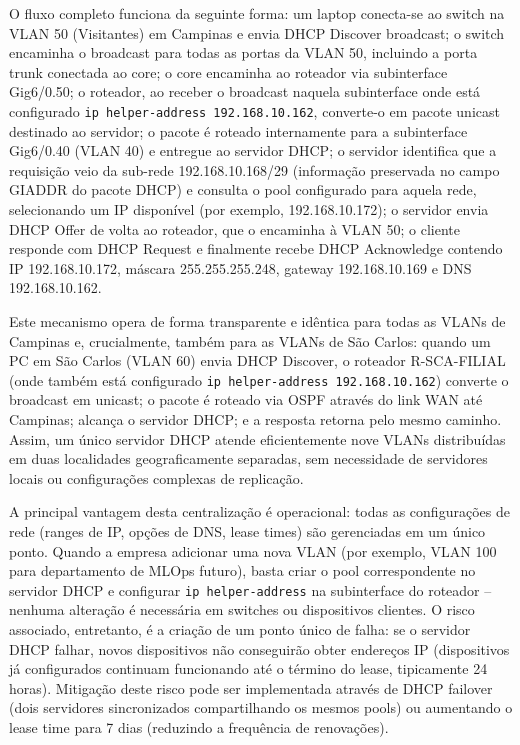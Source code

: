 \documentclass[12pt,a4paper]{article}
\begin{document}
O fluxo completo funciona da seguinte forma: um laptop conecta-se ao switch na VLAN 50 (Visitantes) em Campinas e envia DHCP Discover broadcast; o switch encaminha o broadcast para todas as portas da VLAN 50, incluindo a porta trunk conectada ao core; o core encaminha ao roteador via subinterface Gig6/0.50; o roteador, ao receber o broadcast naquela subinterface onde está configurado \texttt{ip helper-address 192.168.10.162}, converte-o em pacote unicast destinado ao servidor; o pacote é roteado internamente para a subinterface Gig6/0.40 (VLAN 40) e entregue ao servidor DHCP; o servidor identifica que a requisição veio da sub-rede 192.168.10.168/29 (informação preservada no campo GIADDR do pacote DHCP) e consulta o pool configurado para aquela rede, selecionando um IP disponível (por exemplo, 192.168.10.172); o servidor envia DHCP Offer de volta ao roteador, que o encaminha à VLAN 50; o cliente responde com DHCP Request e finalmente recebe DHCP Acknowledge contendo IP 192.168.10.172, máscara 255.255.255.248, gateway 192.168.10.169 e DNS 192.168.10.162.

Este mecanismo opera de forma transparente e idêntica para todas as VLANs de Campinas e, crucialmente, também para as VLANs de São Carlos: quando um PC em São Carlos (VLAN 60) envia DHCP Discover, o roteador R-SCA-FILIAL (onde também está configurado \texttt{ip helper-address 192.168.10.162}) converte o broadcast em unicast; o pacote é roteado via OSPF através do link WAN até Campinas; alcança o servidor DHCP; e a resposta retorna pelo mesmo caminho. Assim, um único servidor DHCP atende eficientemente nove VLANs distribuídas em duas localidades geograficamente separadas, sem necessidade de servidores locais ou configurações complexas de replicação.

A principal vantagem desta centralização é operacional: todas as configurações de rede (ranges de IP, opções de DNS, lease times) são gerenciadas em um único ponto. Quando a empresa adicionar uma nova VLAN (por exemplo, VLAN 100 para departamento de MLOps futuro), basta criar o pool correspondente no servidor DHCP e configurar \texttt{ip helper-address} na subinterface do roteador -- nenhuma alteração é necessária em switches ou dispositivos clientes. O risco associado, entretanto, é a criação de um ponto único de falha: se o servidor DHCP falhar, novos dispositivos não conseguirão obter endereços IP (dispositivos já configurados continuam funcionando até o término do lease, tipicamente 24 horas). Mitigação deste risco pode ser implementada através de DHCP failover (dois servidores sincronizados compartilhando os mesmos pools) ou aumentando o lease time para 7 dias (reduzindo a frequência de renovações).
\end{document}
